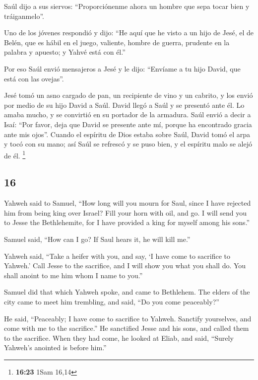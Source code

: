 \begin{paracol}{2}
 Saúl dijo a sus siervos: ``Proporciónenme ahora un
hombre que sepa tocar bien y tráiganmelo''.

 Uno de los jóvenes respondió y dijo: ``He aquí que he
visto a un hijo de Jesé, el de Belén, que es hábil en el juego,
valiente, hombre de guerra, prudente en la palabra y apuesto; y Yahvé
está con él.''

 Por eso Saúl envió mensajeros a Jesé y le dijo:
``Envíame a tu hijo David, que está con las ovejas''.

 Jesé tomó un asno cargado de pan, un recipiente de vino
y un cabrito, y los envió por medio de su hijo David a Saúl.
 David llegó a Saúl y se presentó ante él. Lo amaba
mucho, y se convirtió en su portador de la armadura. 
Saúl envió a decir a Isaí: ``Por favor, deja que David se presente ante
mí, porque ha encontrado gracia ante mis ojos''.  Cuando
el espíritu de Dios estaba sobre Saúl, David tomó el arpa y tocó con su
mano; así Saúl se refrescó y se puso bien, y el espíritu malo se alejó
de él. \footnote{\textbf{16:23} 1Sam 16,14}

\switchcolumn
\begin{otherlanguage}{english}

\hypertarget{section-31}{%
\section{16}\label{section-31}}

 Yahweh said to Samuel, ``How long will you mourn for
Saul, since I have rejected him from being king over Israel? Fill your
horn with oil, and go. I will send you to Jesse the Bethlehemite, for I
have provided a king for myself among his sons.''

 Samuel said, ``How can I go? If Saul hears it, he will
kill me.''

Yahweh said, ``Take a heifer with you, and say, `I have come to
sacrifice to Yahweh.'  Call Jesse to the sacrifice, and I
will show you what you shall do. You shall anoint to me him whom I name
to you.''

 Samuel did that which Yahweh spoke, and came to
Bethlehem. The elders of the city came to meet him trembling, and said,
``Do you come peaceably?''

 He said, ``Peaceably; I have come to sacrifice to Yahweh.
Sanctify yourselves, and come with me to the sacrifice.'' He sanctified
Jesse and his sons, and called them to the sacrifice. 
When they had come, he looked at Eliab, and said, ``Surely Yahweh's
anointed is before him.''


\end{otherlanguage}
\end{paracol}
